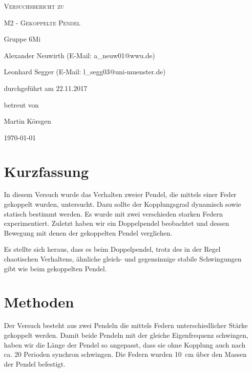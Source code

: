 \documentclass[
	a4paper,
	12pt,
	pagesize,
	ngerman
]{scrartcl}
\begin{document}
	
	\begin{titlepage}
		\centering
		{\scshape\LARGE Versuchsbericht zu \par}
		\vspace{1cm}
		{\scshape\huge M2 - Gekoppelte Pendel\par}
		\vspace{2.5cm}
		{\LARGE Gruppe 6Mi \par}
		\vspace{0.5cm}
		
		{\large Alexander Neuwirth (E-Mail: a\_neuw01@wwu.de) \par}
		{\large Leonhard Segger (E-Mail: l\_segg03@uni-muenster.de) \par}
		\vfill
		
		durchgeführt am 22.11.2017\par
		betreut von\par
		{\large Martin Körsgen}
		
		\vfill
		
		{\large \today\par}
	\end{titlepage}
	\tableofcontents
	\newpage
	
	\section{Kurzfassung}
	In diesem Versuch wurde das Verhalten zweier Pendel, die mittels einer Feder gekoppelt wurden, untersucht. Dazu sollte der Kopplungsgrad dynamisch sowie statisch bestimmt werden.
	Es wurde mit zwei verschieden starken Federn experimentiert.
	Zuletzt haben wir ein Doppelpendel beobachtet und dessen Bewegung mit denen der gekoppelten Pendel verglichen.

	Es stellte sich heraus, dass es beim Doppelpendel, trotz des in der Regel chaotischen Verhaltens, ähnliche gleich- und gegensinnige stabile Schwingungen gibt wie beim gekoppelten Pendel.

	\section{Methoden}
	Der Versuch besteht aus zwei Pendeln die mittels Federn unterschiedlicher Stärke gekoppelt werden. Damit beide Pendeln mit der gleiche Eigenfrequenz schwingen, haben wir die Länge der Pendel so angepasst, dass sie ohne Kopplung auch nach ca. 20 Perioden synchron schwingen. Die Federn wurden \SI{10}{cm} über den Massen der Pendel befestigt. 
	
\end{document}
